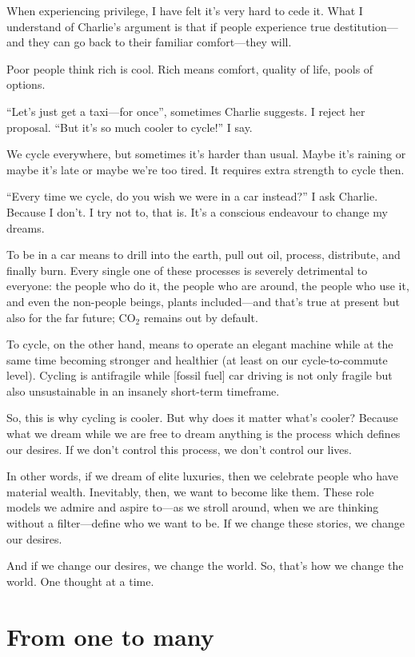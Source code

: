 When experiencing privilege, I have felt it’s very hard to cede it. What I understand of Charlie’s argument is that if people experience true destitution—and they can go back to their familiar comfort—they will.

Poor people think rich is cool. Rich means comfort, quality of life, pools of options.

“Let’s just get a taxi—for once”, sometimes Charlie suggests. I reject her proposal. “But it’s so much cooler to cycle!” I say.

We cycle everywhere, but sometimes it’s harder than usual. Maybe it’s raining or maybe it’s late or maybe we’re too tired. It requires extra strength to cycle then.

“Every time we cycle, do you wish we were in a car instead?” I ask Charlie. Because I don’t. I try not to, that is. It’s a conscious endeavour to change my dreams.

To be in a car means to drill into the earth, pull out oil, process, distribute, and finally burn. Every single one of these processes is severely detrimental to everyone: the people who do it, the people who are around, the people who use it, and even the non-people beings, plants included—and that’s true at present but also for the far future; CO$_{2}$ remains out by default.

To cycle, on the other hand, means to operate an elegant machine while at the same time becoming stronger and healthier (at least on our cycle-to-commute level). Cycling is antifragile while [fossil fuel] car driving is not only fragile but also unsustainable in an insanely short-term timeframe.

So, this is why cycling is cooler. But why does it matter what’s cooler? Because what we dream while we are free to dream anything is the process which defines our desires. If we don’t control this process, we don’t control our lives.

In other words, if we dream of elite luxuries, then we celebrate people who have material wealth. Inevitably, then, we want to become like them. These role models we admire and aspire to—as we stroll around, when we are thinking without a filter—define who we want to be. If we change these stories, we change our desires.

And if we change our desires, we change the world. So, that’s how we change the world. One thought at a time.

\section{From one to many}

